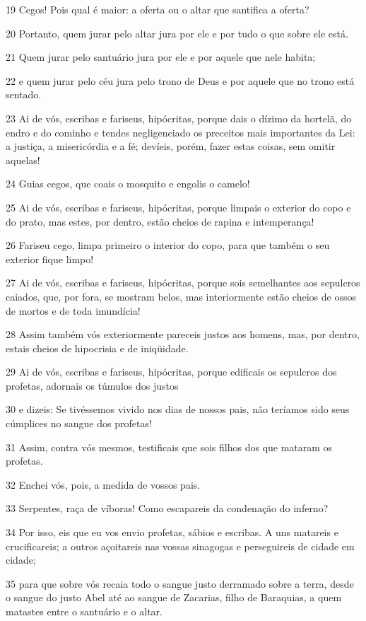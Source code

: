 \par 19 Cegos! Pois qual é maior: a oferta ou o altar que santifica a oferta?
\par 20 Portanto, quem jurar pelo altar jura por ele e por tudo o que sobre ele está.
\par 21 Quem jurar pelo santuário jura por ele e por aquele que nele habita;
\par 22 e quem jurar pelo céu jura pelo trono de Deus e por aquele que no trono está sentado.
\par 23 Ai de vós, escribas e fariseus, hipócritas, porque dais o dízimo da hortelã, do endro e do cominho e tendes negligenciado os preceitos mais importantes da Lei: a justiça, a misericórdia e a fé; devíeis, porém, fazer estas coisas, sem omitir aquelas!
\par 24 Guias cegos, que coais o mosquito e engolis o camelo!
\par 25 Ai de vós, escribas e fariseus, hipócritas, porque limpais o exterior do copo e do prato, mas estes, por dentro, estão cheios de rapina e intemperança!
\par 26 Fariseu cego, limpa primeiro o interior do copo, para que também o seu exterior fique limpo!
\par 27 Ai de vós, escribas e fariseus, hipócritas, porque sois semelhantes aos sepulcros caiados, que, por fora, se mostram belos, mas interiormente estão cheios de ossos de mortos e de toda imundícia!
\par 28 Assim também vós exteriormente pareceis justos aos homens, mas, por dentro, estais cheios de hipocrisia e de iniqüidade.
\par 29 Ai de vós, escribas e fariseus, hipócritas, porque edificais os sepulcros dos profetas, adornais os túmulos dos justos
\par 30 e dizeis: Se tivéssemos vivido nos dias de nossos pais, não teríamos sido seus cúmplices no sangue dos profetas!
\par 31 Assim, contra vós mesmos, testificais que sois filhos dos que mataram os profetas.
\par 32 Enchei vós, pois, a medida de vossos pais.
\par 33 Serpentes, raça de víboras! Como escapareis da condenação do inferno?
\par 34 Por isso, eis que eu vos envio profetas, sábios e escribas. A uns matareis e crucificareis; a outros açoitareis nas vossas sinagogas e perseguireis de cidade em cidade;
\par 35 para que sobre vós recaia todo o sangue justo derramado sobre a terra, desde o sangue do justo Abel até ao sangue de Zacarias, filho de Baraquias, a quem matastes entre o santuário e o altar.
